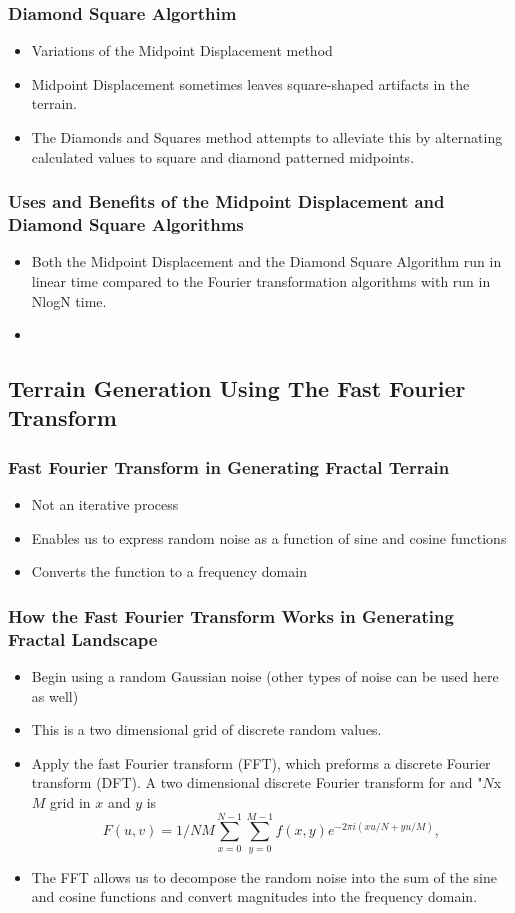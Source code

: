 \documentclass{beamer}
\begin{document}
\begin{frame}
 \frametitle{Diamond Square Algorthim}
\begin{itemize}
\item Variations of the Midpoint Displacement method
\item Midpoint Displacement sometimes leaves square-shaped artifacts in the terrain. 
\item The Diamonds and Squares method attempts to alleviate this by alternating calculated values to square and diamond patterned midpoints. 
\end{itemize}
\end{frame}

\begin{frame}
\frametitle{Uses and Benefits of the Midpoint Displacement and Diamond Square Algorithms}
\begin{itemize}
\item Both the Midpoint Displacement and the Diamond Square Algorithm run in linear time compared to the Fourier transformation algorithms with run in NlogN time.
\item
\end {itemize}
\end{frame}

\subsection{Terrain Generation Using The Fast Fourier Transform}

\begin{frame}
 \frametitle{Fast Fourier Transform in Generating Fractal Terrain}
\begin{itemize}
\item Not an iterative process
\item Enables us to express random noise as a function of sine and cosine functions
\item Converts the function to a frequency domain 
\end{itemize}
\end{frame}



\begin{frame}
 \frametitle{How the Fast Fourier Transform Works in Generating Fractal Landscape}
\begin{itemize}
\item Begin using a random Gaussian noise (other types of noise can be used here as well)
\item This is a two dimensional grid of discrete random values. 
\item Apply the fast Fourier transform (FFT), which preforms a discrete Fourier transform (DFT). A two dimensional discrete Fourier transform for and "$N$x$M$ grid in $x$ and $y$ is 
	$$F(u,v)=1/NM\displaystyle\sum\limits_{x=0}^{N-1} \displaystyle\sum\limits_{y=0}^{M-1} f(x,y)e^{-2\pi i(xu/N+yu/M)},$$
\item The FFT allows us to decompose the random noise into the sum of the sine and cosine functions and convert magnitudes into the frequency domain. 
\end{itemize}
\end{frame}
\end{document}
